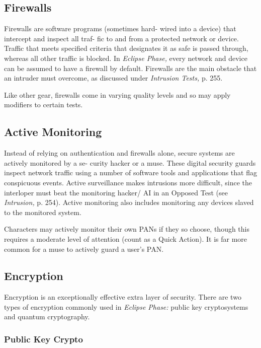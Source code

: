 \subsection{Firewalls}

Firewalls are software programs (sometimes hard-
wired into a device) that intercept and inspect all traf-
fic to and from a protected network or device. Traffic 
that meets specified criteria that designates it as safe 
is passed through, whereas all other traffic is blocked. 
In \textit{Eclipse Phase,} every network and device can be 
assumed to have a firewall by default. Firewalls are 
the main obstacle that an intruder must overcome, as 
discussed under \textit{Intrusion Tests,} p. 255.

Like other gear, firewalls come in varying quality 
levels and so may apply modifiers to certain tests.

\subsection{Active Monitoring}

Instead of relying on authentication and firewalls 
alone, secure systems are actively monitored by a se-
curity hacker or a muse. These digital security guards 
inspect network traffic using a number of software 
tools and applications that flag conspicuous events. 
Active surveillance makes intrusions more difficult, 
since the interloper must beat the monitoring hacker/
AI in an Opposed Test (see \textit{Intrusion,} p. 254). Active 
monitoring also includes monitoring any devices 
slaved to the monitored system.

Characters may actively monitor their own PANs if 
they so choose, though this requires a moderate level 
of attention (count as a Quick Action). It is far more 
common for a muse to actively guard a user's PAN.

\subsection{Encryption}

Encryption is an exceptionally effective extra layer of 
security. There are two types of encryption commonly 
used in \textit{Eclipse Phase:} public key cryptosystems and 
quantum cryptography.

\subsubsection{Public Key Crypto}

